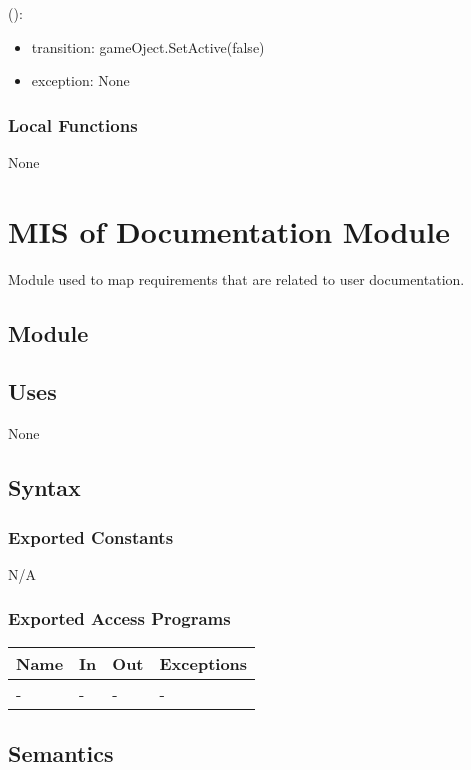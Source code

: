 \documentclass[12pt, titlepage]{article}
\begin{document}
():
\begin{itemize}
\item transition: gameOject.SetActive(false)
\item exception: None
\end{itemize}


\subsubsection{Local Functions}
None

\newpage 

\section{MIS of {Documentation Module}} \label{sec:DocModule} 
Module used to map requirements that are related to user documentation. 
\subsection{Module}

\subsection{Uses}
 None

\subsection{Syntax}

\subsubsection{Exported Constants}
N/A
\subsubsection{Exported Access Programs}

\begin{center}
\begin{tabular}{p{2cm} p{4cm} p{4cm} p{2cm}}
\hline
\textbf{Name} & \textbf{In} & \textbf{Out} & \textbf{Exceptions} \\
\hline
- & - & - & - \\
\hline
\end{tabular}
\end{center}

\subsection{Semantics}
\end{document}
